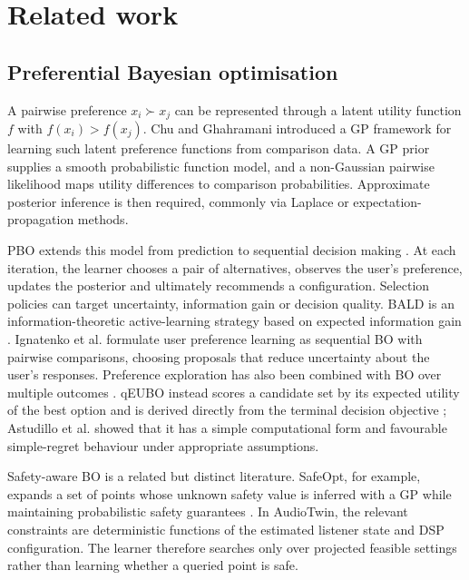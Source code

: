 \documentclass[preprint,12pt]{elsarticle}
\begin{document}
\section{Related work}
\label{sec:related}

\subsection{Preferential Bayesian optimisation}

A pairwise preference $x_i \succ x_j$ can be represented through a latent utility function $f$ with $f(x_i)>f(x_j)$. Chu and Ghahramani \cite{chu2005} introduced a GP framework for learning such latent preference functions from comparison data. A GP prior supplies a smooth probabilistic function model, and a non-Gaussian pairwise likelihood maps utility differences to comparison probabilities. Approximate posterior inference is then required, commonly via Laplace or expectation-propagation methods.

PBO extends this model from prediction to sequential decision making \cite{gonzalez2017}. At each iteration, the learner chooses a pair of alternatives, observes the user's preference, updates the posterior and ultimately recommends a configuration. Selection policies can target uncertainty, information gain or decision quality. BALD is an information-theoretic active-learning strategy based on expected information gain \cite{houlsby2011}. Ignatenko et al. \cite{ignatenko2025} formulate user preference learning as sequential BO with pairwise comparisons, choosing proposals that reduce uncertainty about the user's responses. Preference exploration has also been combined with BO over multiple outcomes \cite{lin2022}. qEUBO instead scores a candidate set by its expected utility of the best option and is derived directly from the terminal decision objective \cite{astudillo2023}; Astudillo et al. showed that it has a simple computational form and favourable simple-regret behaviour under appropriate assumptions.

Safety-aware BO is a related but distinct literature. SafeOpt, for example, expands a set of points whose unknown safety value is inferred with a GP while maintaining probabilistic safety guarantees \cite{sui2015}. In AudioTwin, the relevant constraints are deterministic functions of the estimated listener state and DSP configuration. The learner therefore searches only over projected feasible settings rather than learning whether a queried point is safe.
\end{document}
